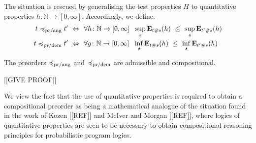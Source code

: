 The situation is rescued by generalising the test properties $H$ to 
quantitative properties $h \colon \mathbb{N} \to [0,\infty]$. 
Accordingly, we define:
\begin{align*}
t \preccurlyeq_{\text{pr/ang}} t' ~ \Leftrightarrow ~ ~& \forall h \colon \mathbb{N} \to [0,\infty]~~ \sup_s  \mathbf{E}_{t\#s} (h)~ \leq~ \sup_s \mathbf{E}_{t'\#s} (h)
\\
t \preccurlyeq_{\text{pr/dem}} t' ~ \Leftrightarrow ~ ~& \forall g \colon \mathbb{N} \to [0,\infty]~~ \inf_s  \mathbf{E}_{t\#s} (h)~ \leq~ \inf_s \mathbf{E}_{t'\#s} (h)
\end{align*}
\begin{proposition}
The preorders $\preccurlyeq_{\text{pr/ang}}$ and $\preccurlyeq_{\text{pr/dem}}$ are admissible and compositional.
\end{proposition}

[[GIVE PROOF]]

We view the fact that the use of quantitative properties is required to obtain a compositional preorder as being
a mathematical analogue of the situation found in the work of Kozen [[REF]] and McIver and Morgan [[REF]], where 
logics of quantitative properties are seen to be necessary to obtain compositional reasoning principles for 
probabilistic program logics.
